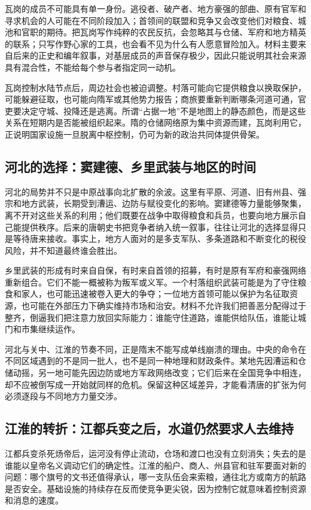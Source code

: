 瓦岗的成员不可能具有单一身份。逃役者、破产者、地方豪强的部曲、原有官军和寻求机会的人可能在不同阶段加入；首领间的联盟和竞争又会改变他们对粮食、城池和官职的期待。把瓦岗写作纯粹的农民反抗，会忽略其与仓储、军府和地方精英的联系；只写作野心家的工具，也会看不见为什么有人愿意冒险加入。材料主要来自后来的正史和编年叙事，对基层成员的声音保存极少，因此只能说明其社会来源具有混合性，不能给每个参与者指定同一动机。

瓦岗控制水陆节点后，周边社会也被迫调整。村落可能向它提供粮食以换取保护，可能躲避征取，也可能向隋军或其他势力报告；商旅要重新判断哪条河道可通，官吏要决定守城、投降还是逃离。所谓“占据一地”不是地图上的静态颜色，而是这些关系在短期内是否能被组织起来。隋的仓储网络原为集中资源而建，瓦岗利用它，正说明国家设施一旦脱离中枢控制，仍可为新的政治共同体提供骨架。

\subsection{河北的选择：窦建德、乡里武装与地区的时间}
河北的局势并不只是中原战事向北扩散的余波。这里有平原、河道、旧有州县、强宗和地方武装，长期受到漕运、边防与赋役变化的影响。窦建德等力量能够聚集，离不开对这些关系的利用；他们既要在战争中取得粮食和兵员，也要向地方展示自己能提供秩序。后来的唐朝史书把竞争者纳入统一叙事，往往让河北的选择显得只是等待唐来接收。事实上，地方人面对的是多支军队、多条道路和不断变化的税役风险，并不知道最终谁会胜出。

乡里武装的形成有时来自自保，有时来自首领的招募，有时是原有军府和豪强网络重新组合。它们不能一概被称为叛军或义军。一个村落组织武装可能是为了守住粮食和家人，也可能迅速被卷入更大的争夺；一位地方首领可能以保护为名征取资源，也可能在外部压力下确实维持市场和治安。材料不允许我们把善恶分配得过于整齐，倒逼我们把注意力放回实际能力：谁能守住道路，谁能供给队伍，谁能让城门和市集继续运作。

河北与关中、江淮的节奏不同，正是隋末不能写成单线崩溃的理由。中央的命令在不同区域遇到的不是同一批人，也不是同一种地理和财政条件。某地先因漕运和仓储动摇，另一地可能先因边防或地方军政网络改变；它们后来在全国竞争中相连，却不应被倒写成一开始就同样的危机。保留这种区域差异，才能看清唐的扩张为何必须逐段与不同地方力量交涉。

\subsection{江淮的转折：江都兵变之后，水道仍然要求人去维持}
江都兵变杀死炀帝后，运河没有停止流动，仓场和渡口也没有立刻消失；失去的是谁能以皇帝名义调动它们的确定性。江淮的船户、商人、州县官和驻军要面对新的问题：哪个旗号的文书还值得承认，哪一支队伍会来索粮，通往北方或南方的航路是否安全。基础设施的持续存在反而使竞争更尖锐，因为控制它就意味着控制资源和消息的速度。


